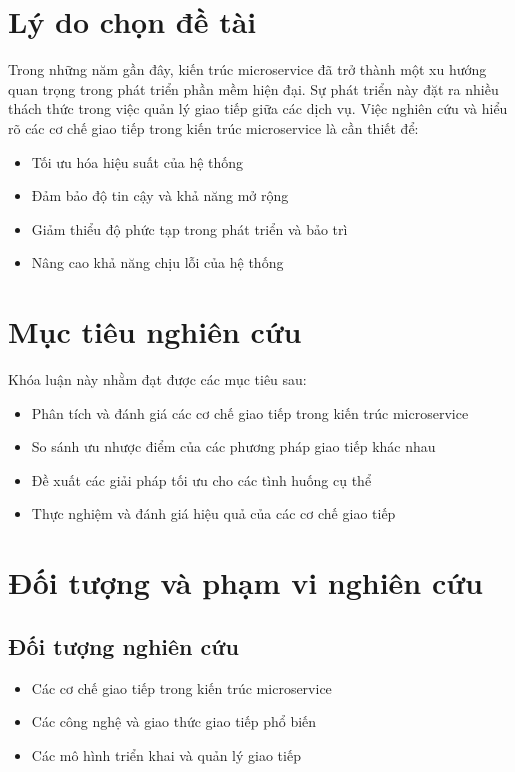 
\section{Lý do chọn đề tài}
Trong những năm gần đây, kiến trúc microservice đã trở thành một xu hướng quan trọng trong phát triển phần mềm hiện đại. Sự phát triển này đặt ra nhiều thách thức trong việc quản lý giao tiếp giữa các dịch vụ. Việc nghiên cứu và hiểu rõ các cơ chế giao tiếp trong kiến trúc microservice là cần thiết để:

\begin{itemize}
    \item Tối ưu hóa hiệu suất của hệ thống
    \item Đảm bảo độ tin cậy và khả năng mở rộng
    \item Giảm thiểu độ phức tạp trong phát triển và bảo trì
    \item Nâng cao khả năng chịu lỗi của hệ thống
\end{itemize}

\section{Mục tiêu nghiên cứu}
Khóa luận này nhằm đạt được các mục tiêu sau:

\begin{itemize}
    \item Phân tích và đánh giá các cơ chế giao tiếp trong kiến trúc microservice
    \item So sánh ưu nhược điểm của các phương pháp giao tiếp khác nhau
    \item Đề xuất các giải pháp tối ưu cho các tình huống cụ thể
    \item Thực nghiệm và đánh giá hiệu quả của các cơ chế giao tiếp
\end{itemize}

\section{Đối tượng và phạm vi nghiên cứu}
\subsection{Đối tượng nghiên cứu}
\begin{itemize}
    \item Các cơ chế giao tiếp trong kiến trúc microservice
    \item Các công nghệ và giao thức giao tiếp phổ biến
    \item Các mô hình triển khai và quản lý giao tiếp
\end{itemize}

